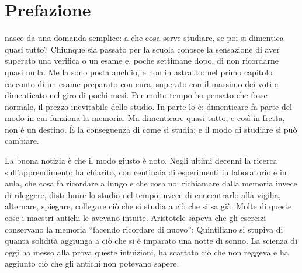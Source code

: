 %
\chapter{Prefazione}

 nasce da una domanda semplice: a che cosa
serve studiare, se poi si dimentica quasi tutto? Chiunque sia passato
per la scuola conosce la sensazione di aver superato una verifica o un
esame e, poche settimane dopo, di non ricordarne quasi nulla. Me la
sono posta anch'io, e non in astratto: nel primo capitolo racconto di
un esame preparato con cura, superato con il massimo dei voti e
dimenticato nel giro di pochi mesi. Per molto tempo ho pensato che
fosse normale, il prezzo inevitabile dello studio. In parte lo è:
dimenticare fa parte del modo in cui funziona la memoria. Ma
dimenticare quasi tutto, e così in fretta, non è un destino. È la
conseguenza di come si studia; e il modo di studiare si può cambiare.

La buona notizia è che il modo giusto è noto. Negli ultimi decenni la
ricerca sull'apprendimento ha chiarito, con centinaia di esperimenti in
laboratorio e in aula, che cosa fa ricordare a lungo e che cosa no:
richiamare dalla memoria invece di rileggere, distribuire lo studio nel
tempo invece di concentrarlo alla vigilia, alternare, spiegare,
collegare ciò che si studia a ciò che si sa già. Molte di queste cose i
maestri antichi le avevano intuite. Aristotele sapeva che gli esercizi
conservano la memoria \enquote{facendo ricordare di nuovo}; Quintiliano
si stupiva di quanta solidità aggiunga a ciò che si è imparato una
notte di sonno. La scienza di oggi ha messo alla prova queste
intuizioni, ha scartato ciò che non reggeva e ha aggiunto ciò che gli
antichi non potevano sapere.

